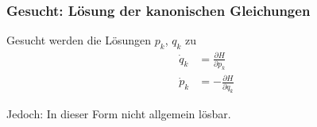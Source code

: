 \begin{frame}
    \frametitle{Gesucht: Lösung der kanonischen Gleichungen}
    
    Gesucht werden die Lösungen $p_k$, $q_k$ zu
    \begin{align*}
        \dot{q}_k &= \frac{\partial H}{\partial p_k} \\
        \dot{p}_k &= -\frac{\partial H}{\partial q_k}
    \end{align*}
    
    Jedoch: In dieser Form nicht allgemein lösbar.
    
\end{frame}